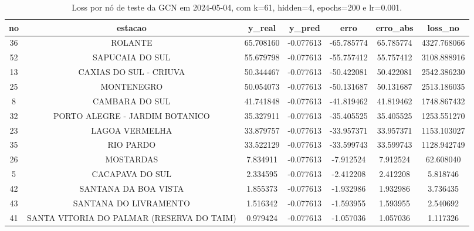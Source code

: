 \begin{table}[h]
\centering
\caption{Loss por nó de teste da GCN em 2024-05-04, com k=61, hidden=4, epochs=200 e lr=0.001.}
\label{tab:gcn_loss_nodes_k61_hidden4}
\begin{tabular}{ccccccc}
\toprule
no & estacao & y\_real & y\_pred & erro & erro\_abs & loss\_no \\
\midrule
36 & ROLANTE & 65.708160 & -0.077613 & -65.785774 & 65.785774 & 4327.768066 \\
52 & SAPUCAIA DO SUL & 55.679798 & -0.077613 & -55.757412 & 55.757412 & 3108.888916 \\
13 & CAXIAS DO SUL - CRIUVA & 50.344467 & -0.077613 & -50.422081 & 50.422081 & 2542.386230 \\
25 & MONTENEGRO & 50.054073 & -0.077613 & -50.131687 & 50.131687 & 2513.186035 \\
8 & CAMBARA DO SUL & 41.741848 & -0.077613 & -41.819462 & 41.819462 & 1748.867432 \\
32 & PORTO ALEGRE - JARDIM BOTANICO & 35.327911 & -0.077613 & -35.405525 & 35.405525 & 1253.551270 \\
23 & LAGOA VERMELHA & 33.879757 & -0.077613 & -33.957371 & 33.957371 & 1153.103027 \\
35 & RIO PARDO & 33.522129 & -0.077613 & -33.599743 & 33.599743 & 1128.942749 \\
26 & MOSTARDAS & 7.834911 & -0.077613 & -7.912524 & 7.912524 & 62.608040 \\
5 & CACAPAVA DO SUL & 2.334595 & -0.077613 & -2.412208 & 2.412208 & 5.818746 \\
42 & SANTANA DA BOA VISTA & 1.855373 & -0.077613 & -1.932986 & 1.932986 & 3.736435 \\
43 & SANTANA DO LIVRAMENTO & 1.516342 & -0.077613 & -1.593955 & 1.593955 & 2.540692 \\
41 & SANTA VITORIA DO PALMAR (RESERVA DO TAIM) & 0.979424 & -0.077613 & -1.057036 & 1.057036 & 1.117326 \\
\bottomrule
\end{tabular}
\end{table}
